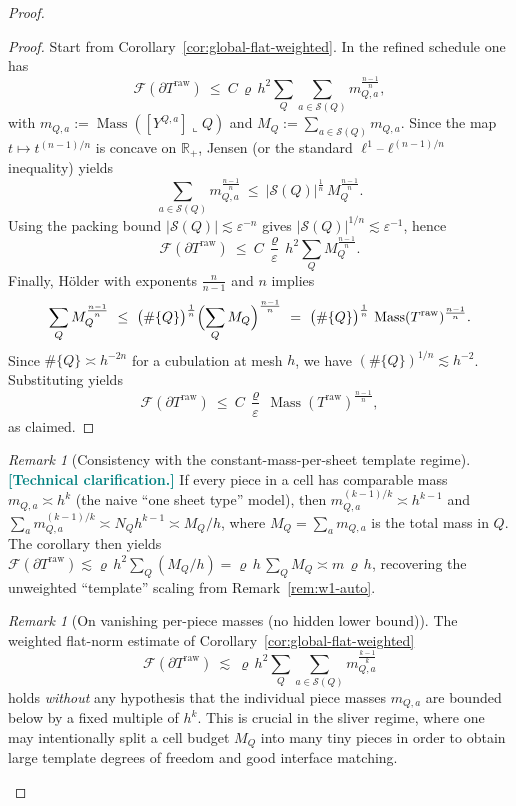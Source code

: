 \documentclass[11pt]{article}
\newcommand{\REVMZ}[1]{\textcolor{teal}{#1}}  %
\numberwithin{equation}{section}  %
\theoremstyle{plain}
\theoremstyle{definition}
\theoremstyle{remark}
\newtheorem{remark}[theorem]{Remark}
\newcommand{\R}{\mathbb{R}}
\DeclareMathOperator{\Mass}{Mass}
\begin{document}
\begin{proof}
\begin{proof}
Start from Corollary~\ref{cor:global-flat-weighted}.  In the refined schedule one has
\[
\mathcal F(\partial T^{\mathrm{raw}})
\ \le\ C\,\varrho\,h^2 \sum_Q \sum_{a\in \mathcal S(Q)} m_{Q,a}^{\frac{n-1}{n}},
\]
with $m_{Q,a}:=\Mass([Y^{Q,a}]\llcorner Q)$ and $M_Q:=\sum_{a\in\mathcal S(Q)} m_{Q,a}$.
Since the map $t\mapsto t^{(n-1)/n}$ is concave on $\R_+$, Jensen (or the standard $\ell^1$--$\ell^{(n-1)/n}$ inequality) yields
\[
\sum_{a\in \mathcal S(Q)} m_{Q,a}^{\frac{n-1}{n}}
\ \le\ |\mathcal S(Q)|^{\frac1n}\,M_Q^{\frac{n-1}{n}}.
\]
Using the packing bound $|\mathcal S(Q)|\lesssim \varepsilon^{-n}$ gives $|\mathcal S(Q)|^{1/n}\lesssim \varepsilon^{-1}$, hence
\[
\mathcal F(\partial T^{\mathrm{raw}})
\ \le\ C\,\frac{\varrho}{\varepsilon}\,h^2 \sum_Q M_Q^{\frac{n-1}{n}}.
\]
Finally, H\"older with exponents $\frac{n}{n-1}$ and $n$ implies
\[
\sum_Q M_Q^{\frac{n-1}{n}}
\ \le\ \bigl(\#\{Q\}\bigr)^{\frac1n}\Bigl(\sum_Q M_Q\Bigr)^{\frac{n-1}{n}}
\ =\ \bigl(\#\{Q\}\bigr)^{\frac1n}\,\Mass(T^{\mathrm{raw}})^{\frac{n-1}{n}}.
\]
Since $\#\{Q\}\asymp h^{-2n}$ for a cubulation at mesh $h$, we have $(\#\{Q\})^{1/n}\lesssim h^{-2}$.
Substituting yields
\[
\mathcal F(\partial T^{\mathrm{raw}})
\ \le\ C\,\frac{\varrho}{\varepsilon}\,\Mass(T^{\mathrm{raw}})^{\frac{n-1}{n}},
\]
as claimed.
\end{proof}





\begin{remark}[Consistency with the constant-mass-per-sheet template regime]
\REVMZ{\textbf{[Technical clarification.]}}
If every piece in a cell has comparable mass $m_{Q,a}\asymp h^{k}$ (the naive ``one sheet type'' model), then
$m_{Q,a}^{(k-1)/k}\asymp h^{k-1}$ and $\sum_a m_{Q,a}^{(k-1)/k}\asymp N_Q h^{k-1}\asymp M_Q/h$, where $M_Q=\sum_a m_{Q,a}$ is the total mass in $Q$.
The corollary then yields $\mathcal F(\partial T^{\mathrm{raw}})\lesssim \varrho\,h^2\sum_Q(M_Q/h)=\varrho\,h\,\sum_Q M_Q\asymp m\,\varrho\,h$,
recovering the unweighted ``template'' scaling from Remark~\ref{rem:w1-auto}.
\end{remark}



\begin{remark}[On vanishing per-piece masses (no hidden lower bound)]\label{rem:no-vanishing-piece-mass}
The weighted flat-norm estimate of Corollary~\ref{cor:global-flat-weighted}
\[
\mathcal F(\partial T^{\mathrm{raw}})\ \lesssim\ \varrho\,h^2\sum_Q\sum_{a\in\mathcal S(Q)} m_{Q,a}^{\frac{k-1}{k}}
\]
holds \emph{without} any hypothesis that the individual piece masses $m_{Q,a}$ are bounded below by a fixed multiple of $h^{k}$.
This is crucial in the sliver regime, where one may intentionally split a cell budget $M_Q$ into many tiny pieces in order to obtain large
template degrees of freedom and good interface matching.


\end{remark}
\end{proof}
\end{document}
